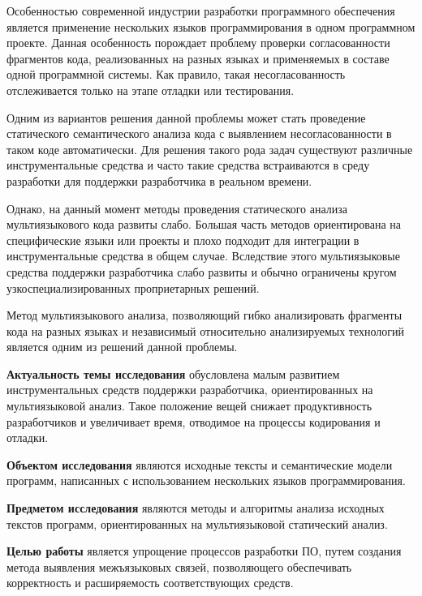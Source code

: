 \Introduction

Особенностью современной индустрии разработки программного обеспечения является применение нескольких языков программирования в
одном программном проекте. Данная особенность порождает проблему проверки согласованности фрагментов кода, реализованных на разных языках и
применяемых в составе одной программной системы. Как правило, такая несогласованность отслеживается только на этапе отладки или тестирования.

Одним из вариантов решения данной проблемы может стать проведение статического семантического анализа кода
с выявлением несогласованности в таком коде автоматически. Для решения такого рода задач существуют различные
инструментальные средства и часто такие средства встраиваются в среду разработки для
поддержки разработчика в реальном времени.

Однако, на данный момент методы проведения статического анализа мультиязыкового
кода развиты слабо. Большая часть методов ориентирована на специфические языки или проекты
и плохо подходит для интеграции в инструментальные средства в общем случае.
Вследствие этого мультиязыковые средства поддержки разработчика слабо развиты
и обычно ограничены кругом узкоспециализированных проприетарных решений.

Метод мультиязыкового анализа, позволяющий гибко анализировать
фрагменты кода на разных языках и независимый относительно анализируемых
технологий является одним из решений данной проблемы.

\textbf{Актуальность темы исследования} обусловлена малым развитием
инструментальных средств поддержки разработчика, ориентированных на мультиязыковой анализ.
Такое положение вещей снижает продуктивность разработчиков и увеличивает время, отводимое
на процессы кодирования и отладки.

\textbf{Объектом исследования} являются исходные тексты и семантические модели
программ, написанных с использованием нескольких языков
программирования.

\textbf{Предметом исследования} являются методы и алгоритмы анализа исходных
текстов программ, ориентированных на мультиязыковой статический анализ.

\textbf{Целью работы} является упрощение процессов разработки ПО, путем создания метода выявления межъязыковых связей,
позволяющего обеспечивать корректность и расширяемость соответствующих средств.


